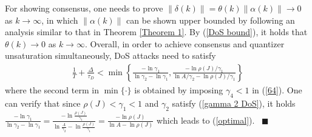 \documentclass[letterpaper,journal,final,twocolumn]{IEEEtran}
\def\qedp{\hspace*{\fill}~{\tiny $\blacksquare$}}
\begin{document}
For showing consensus, one needs to prove $\|\delta(k)\|=\theta(k)\|\alpha(k)\|\to 0$ as $k\to \infty$, in which $\|\alpha(k)\|$ can be shown upper bounded by following an analysis similar to that in Theorem \ref{Theorem 1}. 
By (\ref{DoS bound}), it holds that $\theta(k) \to 0$ as $k \to \infty$.
Overall, in order to achieve consensus and quantizer unsaturation simultaneously, DoS attacks need to satisfy 
\begin{eqnarray}\label{67}
\frac{1}{T} + \frac{\Delta}{\tau_D} < \min \left\{\frac{-\ln \gamma_1}{\ln \gamma_2 - \ln \gamma_1},  \frac{- \ln \rho(J)/ \gamma_1 }{\ln A/\gamma_2 - \ln \rho(J)/\gamma_1} \right\}
\end{eqnarray}
where the second term in $\min\{\cdot\}$ is obtained by imposing $\gamma_4<1$ in (\ref{64}).
One can verify that since $\rho(J)<\gamma_1<1$ and $\gamma_2$ satisfy (\ref{gamma 2 DoS}),
it holds 
$
\frac{-\ln \gamma_1}{\ln \gamma_2 - \ln \gamma_1}=   \frac{- \ln \frac{\rho(J)}{ \gamma_1}  }{\ln \frac{A}{\gamma_2} - \ln \frac{\rho(J)}{\gamma_1}} =
\frac{-\ln \rho(J)}{\ln A - \ln \rho(J)}
$
which leads to (\ref{optimal}). 
%
\qedp
\end{document}
